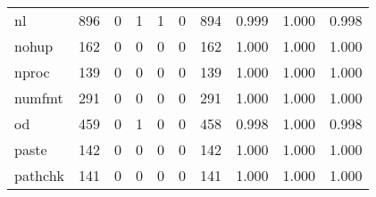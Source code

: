 \begin{longtable}{lp{1.3cm}p{1.3cm}p{1.3cm}p{1.3cm}p{1.3cm}p{1.3cm}p{1.3cm}p{1.3cm}p{1.3cm}}
nl        &                    896 &                                  0 &                                 1 &                                1 &                                 0 &                             894 &                                   0.999 &                                  1.000 &                                0.998 \\
nohup     &                    162 &                                  0 &                                 0 &                                0 &                                 0 &                             162 &                                   1.000 &                                  1.000 &                                1.000 \\
nproc     &                    139 &                                  0 &                                 0 &                                0 &                                 0 &                             139 &                                   1.000 &                                  1.000 &                                1.000 \\
numfmt    &                    291 &                                  0 &                                 0 &                                0 &                                 0 &                             291 &                                   1.000 &                                  1.000 &                                1.000 \\
od        &                    459 &                                  0 &                                 1 &                                0 &                                 0 &                             458 &                                   0.998 &                                  1.000 &                                0.998 \\
paste     &                    142 &                                  0 &                                 0 &                                0 &                                 0 &                             142 &                                   1.000 &                                  1.000 &                                1.000 \\
pathchk   &                    141 &                                  0 &                                 0 &                                0 &                                 0 &                             141 &                                   1.000 &                                  1.000 &                                1.000 \\

\end{longtable}
